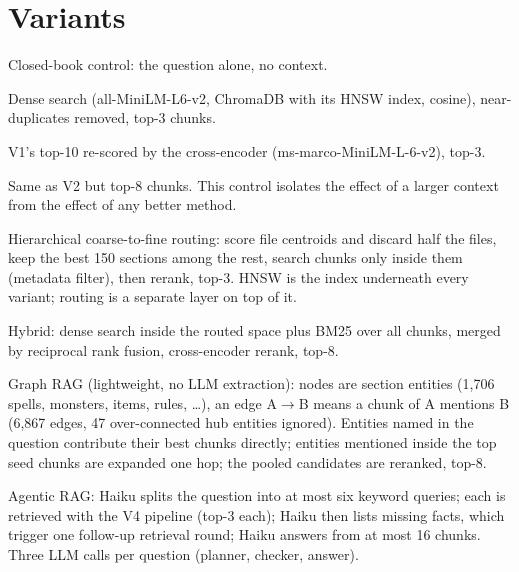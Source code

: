\documentclass[11pt,a4paper]{article}
\begin{document}
\section{Variants}
\begin{description}[leftmargin=1.2cm,labelwidth=1cm]
\item[V0] Closed-book control: the question alone, no context.
\item[V1] Dense search (all-MiniLM-L6-v2, ChromaDB with its HNSW index, cosine), near-duplicates removed, top-3 chunks.
\item[V2] V1's top-10 re-scored by the cross-encoder (ms-marco-MiniLM-L-6-v2), top-3.
\item[V2b] Same as V2 but top-8 chunks. This control isolates the effect of a larger context from the effect of any better method.
\item[V3] Hierarchical coarse-to-fine routing: score file centroids and discard half the files, keep the best 150 sections among the rest, search chunks only inside them (metadata filter), then rerank, top-3. HNSW is the index underneath every variant; routing is a separate layer on top of it.
\item[V4] Hybrid: dense search inside the routed space plus BM25 over all chunks, merged by reciprocal rank fusion, cross-encoder rerank, top-8.
\item[V5] Graph RAG (lightweight, no LLM extraction): nodes are section entities (1{,}706 spells, monsters, items, rules, \dots), an edge A$\to$B means a chunk of A mentions B (6{,}867 edges, 47 over-connected hub entities ignored). Entities named in the question contribute their best chunks directly; entities mentioned inside the top seed chunks are expanded one hop; the pooled candidates are reranked, top-8.
\item[V6] Agentic RAG: Haiku splits the question into at most six keyword queries; each is retrieved with the V4 pipeline (top-3 each); Haiku then lists missing facts, which trigger one follow-up retrieval round; Haiku answers from at most 16 chunks. Three LLM calls per question (planner, checker, answer).
\end{description}
\end{document}

